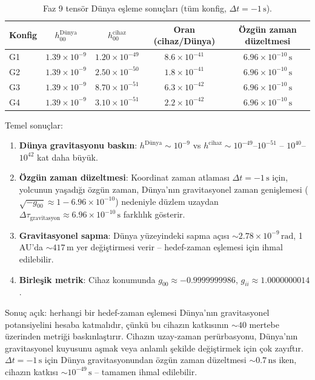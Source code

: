 \begin{table}[t]
\centering
\caption{Faz 9 tensör Dünya eşleme sonuçları (tüm konfig, $\Delta t = -1\,\text{s}$).}
\label{tab:phase9-tensor-earth}
\begin{tabular}{lcccc}
\hline
Konfig & $h^{\text{Dünya}}_{00}$ & $h^{\text{cihaz}}_{00}$ & Oran (cihaz/Dünya) & Özgün zaman düzeltmesi \\
\hline
G1 & $1.39\times 10^{-9}$ & $1.20\times 10^{-49}$ & $8.6\times 10^{-41}$ & $6.96\times 10^{-10}\,\text{s}$ \\
G2 & $1.39\times 10^{-9}$ & $2.50\times 10^{-50}$ & $1.8\times 10^{-41}$ & $6.96\times 10^{-10}\,\text{s}$ \\
G3 & $1.39\times 10^{-9}$ & $8.70\times 10^{-51}$ & $6.3\times 10^{-42}$ & $6.96\times 10^{-10}\,\text{s}$ \\
G4 & $1.39\times 10^{-9}$ & $3.10\times 10^{-51}$ & $2.2\times 10^{-42}$ & $6.96\times 10^{-10}\,\text{s}$ \\
\hline
\end{tabular}
\end{table}

Temel sonuçlar:
\begin{enumerate}
    \item \textbf{Dünya gravitasyonu baskın}: $h^{\text{Dünya}} \sim 10^{-9}$ vs $h^{\text{cihaz}} \sim 10^{-49}$--$10^{-51}$ -- $10^{40}$--$10^{42}$ kat daha büyük.
    \item \textbf{Özgün zaman düzeltmesi}: Koordinat zaman atlaması $\Delta t = -1\,\text{s}$ için, yolcunun yaşadığı özgün zaman, Dünya'nın gravitasyonel zaman genişlemesi ($\sqrt{-g_{00}} \approx 1 - 6.96\times 10^{-10}$) nedeniyle düzlem uzaydan $\Delta\tau_{\text{gravitasyon}} \approx 6.96\times 10^{-10}\,\text{s}$ farklılık gösterir.
    \item \textbf{Gravitasyonel sapma}: Dünya yüzeyindeki sapma açısı $\sim 2.78\times 10^{-9}\,\text{rad}$, 1 AU'da $\sim 417\,\text{m}$ yer değiştirmesi verir -- hedef-zaman eşlemesi için ihmal edilebilir.
    \item \textbf{Birleşik metrik}: Cihaz konumunda $g_{00} \approx -0.9999999986$, $g_{ii} \approx 1.0000000014$.
\end{enumerate}

Sonuç açık: herhangi bir hedef-zaman eşlemesi Dünya'nın gravitasyonel potansiyelini hesaba katmalıdır, çünkü bu cihazın katkısının $\sim 40$ mertebe üzerinden metriği baskınlaştırır. Cihazın uzay-zaman perürbasyonu, Dünya'nın gravitasyonel kuyusunu aşmak veya anlamlı şekilde değiştirmek için çok zayıftır. $\Delta t = -1\,\text{s}$ için Dünya gravitasyonundan özgün zaman düzeltmesi $\sim 0.7\,\text{ns}$ iken, cihazın katkısı $\sim 10^{-49}\,\text{s}$ -- tamamen ihmal edilebilir.

